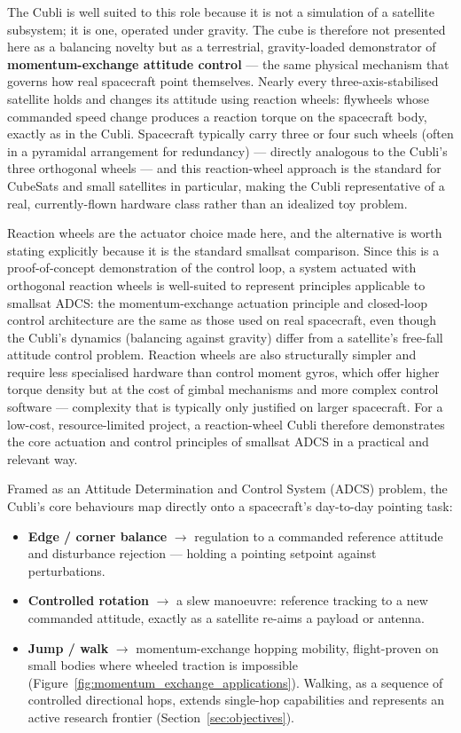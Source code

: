 The Cubli is well suited to this role because it is not a simulation of a satellite subsystem; it is one, operated under gravity. The cube is therefore not presented here as a balancing novelty but as a terrestrial, gravity-loaded demonstrator of \textbf{momentum-exchange attitude control} — the same physical mechanism that governs how real spacecraft point themselves. Nearly every three-axis-stabilised satellite holds and changes its attitude using reaction wheels: flywheels whose commanded speed change produces a reaction torque on the spacecraft body, exactly as in the Cubli. Spacecraft typically carry three or four such wheels (often in a pyramidal arrangement for redundancy) — directly analogous to the Cubli's three orthogonal wheels — and this reaction-wheel approach is the standard for CubeSats and small satellites in particular, making the Cubli representative of a real, currently-flown hardware class rather than an idealized toy problem.

\label{sec:tradeoff}
Reaction wheels are the actuator choice made here, and the alternative is worth stating explicitly because it is the standard smallsat comparison. Since this is a proof-of-concept demonstration of the control loop, a system actuated with orthogonal reaction wheels is well-suited to represent principles applicable to smallsat ADCS: the momentum-exchange actuation principle and closed-loop control architecture are the same as those used on real spacecraft, even though the Cubli's dynamics (balancing against gravity) differ from a satellite's free-fall attitude control problem. Reaction wheels are also structurally simpler and require less specialised hardware than control moment gyros, which offer higher torque density but at the cost of gimbal mechanisms and more complex control software --- complexity that is typically only justified on larger spacecraft. For a low-cost, resource-limited project, a reaction-wheel Cubli therefore demonstrates the core actuation and control principles of smallsat ADCS in a practical and relevant way.

Framed as an Attitude Determination and Control System (ADCS) problem, the Cubli's core behaviours map directly onto a spacecraft's day-to-day pointing task:

\begin{itemize}
    \item \textbf{Edge / corner balance} $\rightarrow$ regulation to a commanded reference attitude and disturbance rejection --- holding a pointing setpoint against perturbations.
    \item \textbf{Controlled rotation} $\rightarrow$ a slew manoeuvre: reference tracking to a new commanded attitude, exactly as a satellite re-aims a payload or antenna.
    \item \textbf{Jump / walk} $\rightarrow$ momentum-exchange hopping mobility, flight-proven on small bodies where wheeled traction is impossible (Figure~\ref{fig:momentum_exchange_applications}). Walking, as a sequence of controlled directional hops, extends single-hop capabilities and represents an active research frontier (Section~\ref{sec:objectives}).
\end{itemize}

